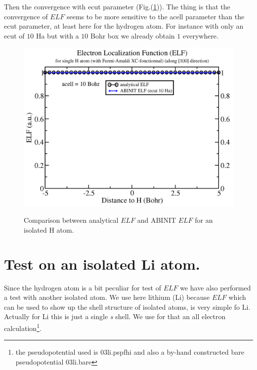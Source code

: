 \documentclass[a4paper,12pt]{report}
\begin{document}
Then the convergence with ecut parameter (Fig.(\ref{fig1})). The thing is that the convergence of $ELF$ seems to be more sensitive to the acell parameter than the ecut parameter, at least here for the hydrogen atom. For instance with only an ecut of $10$ Ha but with a $10$ Bohr box we already obtain $1$ everywhere.
\begin{figure}[!h]
\centering
\begin{minipage}[c]{1.0\textwidth}
\includegraphics[width = \textwidth]{fig2}
\end{minipage}
\vspace{0.12\textwidth}
\begin{minipage}[c]{0.8\textwidth}
\caption{\small Comparison between analytical $ELF$ and ABINIT $ELF$ for an isolated H atom.}
\vspace*{1.0ex}
\label{fig1}
\end{minipage}
\end{figure}


\chapter{Test on an isolated Li atom.}
\label{chapter2}

Since the hydrogen atom is a bit peculiar for test of $ELF$ we have also performed a test with another isolated atom. We use here lithium (Li) because $ELF$ which can be used to show up the shell structure of isolated atoms, is very simple fo Li. Actually for Li this is just a single \textit{s} shell. We use for that an all electron calculation\footnote{the pseudopotential used is 03li.pspfhi and also a by-hand constructed bare pseudopotential 03li.bare}.
\end{document}
